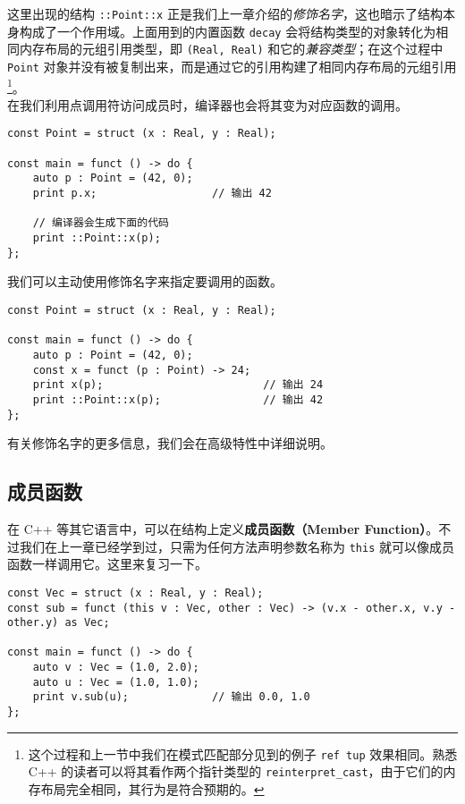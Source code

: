 这里出现的结构 \lstinline!::Point::x! 正是我们上一章介绍的\emph{修饰名字}，这也暗示了结构本身构成了一个作用域。上面用到的内置函数 \lstinline!decay! 会将结构类型的对象转化为相同内存布局的元组引用类型，即 \lstinline!(Real, Real)! 和它的\emph{兼容类型}；在这个过程中 \lstinline!Point! 对象并没有被复制出来，而是通过它的引用构建了相同内存布局的元组引用 \footnote{这个过程和上一节中我们在模式匹配部分见到的例子 \lstinline!ref tup! 效果相同。熟悉 C++ 的读者可以将其看作两个指针类型的 \lstinline!reinterpret_cast!，由于它们的内存布局完全相同，其行为是符合预期的。}。 \\

在我们利用点调用符访问成员时，编译器也会将其变为对应函数的调用。

\begin{minipage}[c]{0.95\textwidth}
\vspace{1.0em}
\begin{lstlisting}
const Point = struct (x : Real, y : Real);

const main = funct () -> do {
	auto p : Point = (42, 0);
	print p.x;					// 输出 42

	// 编译器会生成下面的代码
	print ::Point::x(p);
};
\end{lstlisting}
\end{minipage}


我们可以主动使用修饰名字来指定要调用的函数。

\begin{lstlisting}
const Point = struct (x : Real, y : Real);

const main = funct () -> do {
	auto p : Point = (42, 0);
	const x = funct (p : Point) -> 24;
	print x(p);							// 输出 24
	print ::Point::x(p);				// 输出 42
};
\end{lstlisting}

有关修饰名字的更多信息，我们会在高级特性中详细说明。


\subsection{成员函数}

在 C++ 等其它语言中，可以在结构上定义\textbf{成员函数（Member Function）}。不过我们在上一章已经学到过，只需为任何方法声明参数名称为 \lstinline!this! 就可以像成员函数一样调用它。这里来复习一下。

\begin{lstlisting}
const Vec = struct (x : Real, y : Real);
const sub = funct (this v : Vec, other : Vec) -> (v.x - other.x, v.y - other.y) as Vec;

const main = funct () -> do {
	auto v : Vec = (1.0, 2.0);
	auto u : Vec = (1.0, 1.0);
	print v.sub(u);				// 输出 0.0, 1.0
};
\end{lstlisting}

